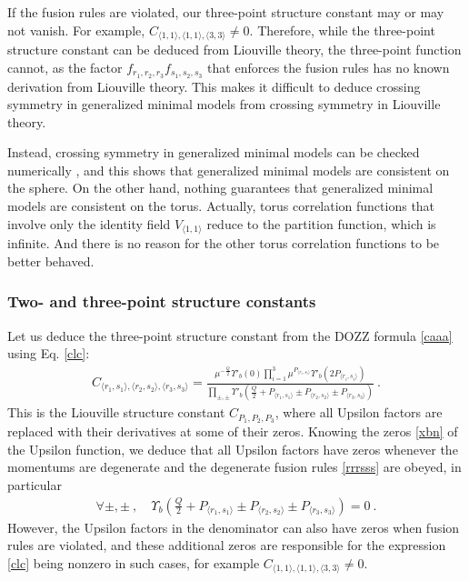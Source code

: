 \documentclass[12pt, a4paper, notitlepage, twoside]{report}
\numberwithin{equation}{section}
\theoremstyle{break}
\begin{document}
If the fusion rules are violated, our three-point structure constant may or may not vanish. For example, $C_{\langle 1,1\rangle , \langle 1,1 \rangle,\langle 3,3 \rangle} \neq 0$.
Therefore, while the three-point structure constant can be deduced from Liouville theory, the three-point function cannot, as the factor 
$f_{r_1,r_2,r_3} f_{s_1,s_2,s_3}$ that enforces the fusion rules has no known derivation from Liouville theory. 
This makes it difficult to deduce crossing symmetry in generalized minimal models from crossing symmetry in Liouville theory. 

Instead, crossing symmetry in generalized minimal models can be checked numerically \cite{rs15}, and this shows that generalized minimal models are consistent on the sphere. 
On the other hand, nothing guarantees that generalized minimal models are consistent on the torus. Actually, torus correlation functions that involve only the identity field $V_{\langle 1,1\rangle}$ reduce to the partition function, which is infinite. And there is no reason for the other torus correlation functions to be better behaved.  


\subsubsection{Two- and three-point structure constants}

Let us deduce the three-point structure constant from the DOZZ formula \eqref{caaa} using Eq. \eqref{clc}:
\begin{align}
 C_{\langle r_1,s_1\rangle ,\langle r_2,s_2\rangle ,\langle r_3,s_3 \rangle} =   \frac{\mu^{-\frac{Q}{2}}\Upsilon'_b(0)\prod_{i=1}^3 \mu^{P_{\langle r_i,s_i \rangle}}\Upsilon'_b(2P_{\langle r_i,s_i \rangle}) }{\prod_{\pm,\pm} \Upsilon'_b\left(\tfrac{Q}{2}+P_{\langle r_1,s_1 \rangle}\pm P_{\langle r_2,s_2 \rangle} \pm P_{\langle r_3,s_3 \rangle}\right)} \ .
\label{crisi}
\end{align}
This is the Liouville structure constant $C_{P_1,P_2,P_3}$, where all Upsilon factors are replaced with their derivatives at some of their zeros.
Knowing the zeros \eqref{xbn} of the Upsilon function, we deduce that 
all Upsilon factors have zeros whenever
the momentums are degenerate and the degenerate fusion rules \eqref{rrrsss} are obeyed, in particular
\begin{align}
 \forall \pm, \pm\ , \quad \Upsilon_b\left(\tfrac{Q}{2}+P_{\langle r_1,s_1 \rangle}\pm P_{\langle r_2,s_2 \rangle} \pm P_{\langle r_3,s_3 \rangle}\right) = 0\ .
\end{align}
However, the Upsilon factors in the denominator can also have zeros when fusion rules are violated, and these additional zeros are responsible for the expression \eqref{clc} being nonzero in such cases, for example $C_{\langle 1,1\rangle , \langle 1,1 \rangle,\langle 3,3 \rangle} \neq 0$.
\end{document}
